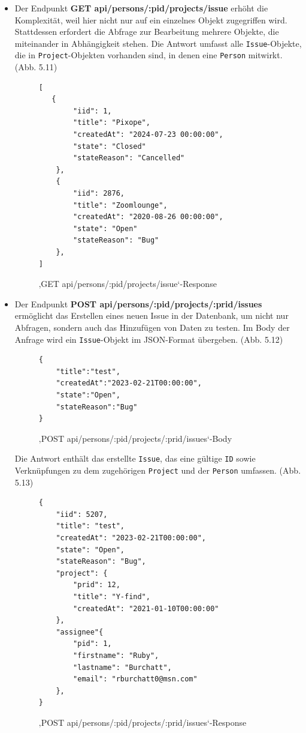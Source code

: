 \begin{itemize}
\item Der Endpunkt \colorbox{gray!20}{\textbf{GET api/persons/:pid/projects/issue}} erhöht die Komplexität, weil hier nicht nur auf ein einzelnes Objekt zugegriffen wird. Stattdessen erfordert die Abfrage zur Bearbeitung mehrere Objekte, die miteinander in Abhängigkeit stehen. Die Antwort umfasst alle  \texttt{Issue}-Objekte, die in  \texttt{Project}-Objekten vorhanden sind, in denen eine  \texttt{Person} mitwirkt. (Abb. 5.11)
\begin{figure}[H]
\begin{center}
\begin{BVerbatim}
[
   {
        "iid": 1,
        "title": "Pixope",
        "createdAt": "2024-07-23 00:00:00",
        "state": "Closed"
        "stateReason": "Cancelled"
    },
    {
        "iid": 2876,
        "title": "Zoomlounge",
        "createdAt": "2020-08-26 00:00:00",
        "state": "Open"
        "stateReason": "Bug"
    },
]
\end{BVerbatim}
\end{center}
\caption{‚GET api/persons/:pid/projects/issue‘-Response}
\end{figure}

\item Der Endpunkt \colorbox{gray!20}{\textbf{POST api/persons/:pid/projects/:prid/issues}} ermöglicht das Erstellen eines neuen Issue in der Datenbank, um nicht nur Abfragen, sondern auch das Hinzufügen von Daten zu testen. Im Body der Anfrage wird ein  \texttt{Issue}-Objekt im JSON-Format übergeben. (Abb. 5.12)
\newline
\begin{figure}[H]
\begin{center}
\begin{BVerbatim}
{
    "title":"test",
    "createdAt":"2023-02-21T00:00:00",
    "state":"Open",
    "stateReason":"Bug"
}
\end{BVerbatim}
\end{center}
\caption{‚POST api/persons/:pid/projects/:prid/issues‘-Body}
\end{figure}
\newpage
\noindent
Die Antwort enthält das erstellte \texttt{Issue}, das eine gültige  \texttt{ID} sowie Verknüpfungen zu dem zugehörigen  \texttt{Project} und der  \texttt{Person} umfassen. (Abb. 5.13)
\begin{figure}[H]
\begin{center}
\begin{BVerbatim}
{
    "iid": 5207,
    "title": "test",
    "createdAt": "2023-02-21T00:00:00",
    "state": "Open",
    "stateReason": "Bug",
    "project": {
        "prid": 12,
        "title": "Y-find",
        "createdAt": "2021-01-10T00:00:00"
    },
    "assignee"{
        "pid": 1,
        "firstname": "Ruby",
        "lastname": "Burchatt",
        "email": "rburchatt0@msn.com"
    },
}
\end{BVerbatim}
\end{center}
\caption{‚POST api/persons/:pid/projects/:prid/issues‘-Response}
\end{figure}
\end{itemize}

